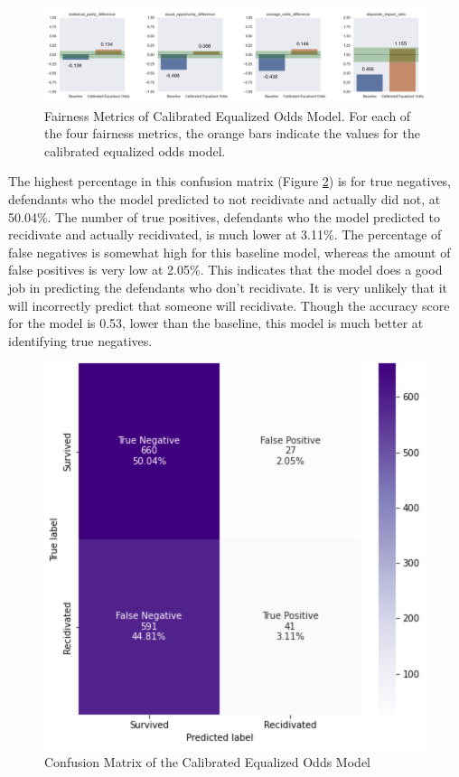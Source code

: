 \documentclass[water,article,submit,moreauthors,pdftex]{mdpi}
\begin{document}
\begin{figure}

{\centering \includegraphics[width=1\linewidth]{../images/calibrated_equalized_odds_metrics} 

}

\caption{Fairness Metrics of Calibrated Equalized Odds Model. For each of the four fairness metrics, the orange bars indicate the values for the calibrated equalized odds model.}\label{fig:ceo metrics}
\end{figure}

The highest percentage in this confusion matrix (Figure
\ref{fig:ceo matrix}) is for true negatives, defendants who the model
predicted to not recidivate and actually did not, at 50.04\%. The number
of true positives, defendants who the model predicted to recidivate and
actually recidivated, is much lower at 3.11\%. The percentage of false
negatives is somewhat high for this baseline model, whereas the amount
of false positives is very low at 2.05\%. This indicates that the model
does a good job in predicting the defendants who don't recidivate. It is
very unlikely that it will incorrectly predict that someone will
recidivate. Though the accuracy score for the model is 0.53, lower than
the baseline, this model is much better at identifying true negatives.

\begin{figure}

{\centering \includegraphics[width=1\linewidth]{../images/ceo_matrix} 

}

\caption{Confusion Matrix of the Calibrated Equalized Odds Model}\label{fig:ceo matrix}
\end{figure}
\end{document}
